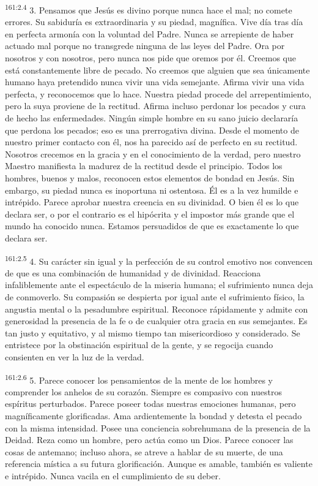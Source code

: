\par 
\textsuperscript{161:2.4} 3. Pensamos que Jesús es divino porque nunca hace el mal; no comete errores. Su sabiduría es extraordinaria y su piedad, magnífica. Vive día tras día en perfecta armonía con la voluntad del Padre. Nunca se arrepiente de haber actuado mal porque no transgrede ninguna de las leyes del Padre. Ora por nosotros y con nosotros, pero nunca nos pide que oremos por él. Creemos que está constantemente libre de pecado. No creemos que alguien que sea únicamente humano haya pretendido nunca vivir una vida semejante. Afirma vivir una vida perfecta, y reconocemos que lo hace. Nuestra piedad procede del arrepentimiento, pero la suya proviene de la rectitud. Afirma incluso perdonar los pecados y cura de hecho las enfermedades. Ningún simple hombre en su sano juicio declararía que perdona los pecados; eso es una prerrogativa divina. Desde el momento de nuestro primer contacto con él, nos ha parecido así de perfecto en su rectitud. Nosotros crecemos en la gracia y en el conocimiento de la verdad, pero nuestro Maestro manifiesta la madurez de la rectitud desde el principio. Todos los hombres, buenos y malos, reconocen estos elementos de bondad en Jesús. Sin embargo, su piedad nunca es inoportuna ni ostentosa. Él es a la vez humilde e intrépido. Parece aprobar nuestra creencia en su divinidad. O bien él es lo que declara ser, o por el contrario es el hipócrita y el impostor más grande que el mundo ha conocido nunca. Estamos persuadidos de que es exactamente lo que declara ser.

\par 
\textsuperscript{161:2.5} 4. Su carácter sin igual y la perfección de su control emotivo nos convencen de que es una combinación de humanidad y de divinidad. Reacciona infaliblemente ante el espectáculo de la miseria humana; el sufrimiento nunca deja de conmoverlo. Su compasión se despierta por igual ante el sufrimiento físico, la angustia mental o la pesadumbre espiritual. Reconoce rápidamente y admite con generosidad la presencia de la fe o de cualquier otra gracia en sus semejantes. Es tan justo y equitativo, y al mismo tiempo tan misericordioso y considerado. Se entristece por la obstinación espiritual de la gente, y se regocija cuando consienten en ver la luz de la verdad.

\par 
\textsuperscript{161:2.6} 5. Parece conocer los pensamientos de la mente de los hombres y comprender los anhelos de su corazón. Siempre es compasivo con nuestros espíritus perturbados. Parece poseer todas nuestras emociones humanas, pero magníficamente glorificadas. Ama ardientemente la bondad y detesta el pecado con la misma intensidad. Posee una conciencia sobrehumana de la presencia de la Deidad. Reza como un hombre, pero actúa como un Dios. Parece conocer las cosas de antemano; incluso ahora, se atreve a hablar de su muerte, de una referencia mística a su futura glorificación. Aunque es amable, también es valiente e intrépido. Nunca vacila en el cumplimiento de su deber.

